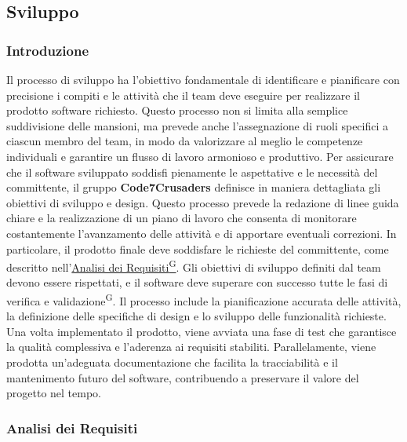 
\subsection{Sviluppo}
\subsubsection{Introduzione}
Il processo di sviluppo ha l’obiettivo fondamentale di identificare e pianificare con precisione i compiti e le attività che il team deve eseguire per realizzare il prodotto software richiesto. Questo processo non si limita alla semplice suddivisione delle mansioni, ma prevede anche l’assegnazione di ruoli specifici a ciascun membro del team, in modo da valorizzare al meglio le competenze individuali e garantire un flusso di lavoro armonioso e produttivo.  
Per assicurare che il software sviluppato soddisfi pienamente le aspettative e le necessità del committente, il gruppo \textbf{Code7Crusaders} definisce in maniera dettagliata gli obiettivi di sviluppo e design. Questo processo prevede la redazione di linee guida chiare e la realizzazione di un piano di lavoro che consenta di monitorare costantemente l’avanzamento delle attività e di apportare eventuali correzioni. In particolare, il prodotto finale deve soddisfare le richieste del committente, come descritto nell’\href{https://code7crusaders.github.io/docs/PB/documentazione_interna/glossario.html#analisi-dei-requisiti}{Analisi dei Requisiti\textsuperscript{G}}. 
Gli obiettivi di sviluppo definiti dal team devono essere rispettati, e il software deve superare con successo tutte le fasi di verifica e validazione\textsuperscript{G}. Il processo include la pianificazione accurata delle attività, la definizione delle specifiche di design e lo sviluppo delle funzionalità richieste. Una volta implementato il prodotto, viene avviata una fase di test che garantisce la qualità complessiva e l’aderenza ai requisiti stabiliti. Parallelamente, viene prodotta un’adeguata documentazione che facilita la tracciabilità e il mantenimento futuro del software, contribuendo a preservare il valore del progetto nel tempo.  

\subsubsection{Analisi dei Requisiti}

